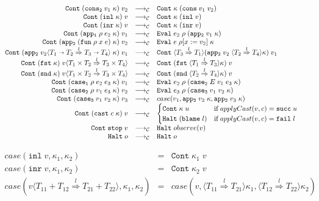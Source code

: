\documentclass[acmsmall,review,anonymous]{acmart}\settopmatter{printfolios=true,printccs=false,printacmref=false}
\newcommand{\funrule}[3]{#1 &=& #2 & #3\\}
\newcommand{\plus}[0]{+}
\newcommand{\sOOinspect}[3]{\mathtt{Eval} \; #1 \; #2 \; #3}
\newcommand{\sOOreturn}[2]{\mathtt{Cont} \; #2 \; #1}
\newcommand{\sOOhalt}[1]{\mathtt{Halt} \; #1}
\newcommand{\POOfun}[2]{#1 \shortrightarrow #2}
\newcommand{\POOprod}[2]{#1 \times #2}
\newcommand{\POOsum}[2]{#1 \plus #2}
\newcommand{\cOOcast}[3]{#1 \overset{#2}{\Rightarrow} #3}
\newcommand{\oOOblame}[1]{\mathtt{blame} \; #1}
\newcommand{\vOOcast}[2]{#1\langle#2\rangle}
\newcommand{\vOOfun}[3]{\mathtt{fun} \; #1 \; #2 \; #3}
\newcommand{\vOOcons}[2]{\mathtt{cons}\;#1\;#2}
\newcommand{\vOOinl}[1]{\mathtt{inl}\;#1}
\newcommand{\vOOinr}[1]{\mathtt{inr}\;#1}
\newcommand{\rOOsucc}[1]{\mathtt{succ}\;#1}
\newcommand{\rOOfail}[1]{\mathtt{fail}\;#1}
\newcommand{\kOOmt}[0]{\mathtt{stop}}
\newcommand{\kOOconsII}[2]{\mathtt{cons_2} \; #1 \; #2}
\newcommand{\kOOinl}[1]{\mathtt{inl} \; #1}
\newcommand{\kOOinr}[1]{\mathtt{inr} \; #1}
\newcommand{\kOOappI}[3]{
	\mathtt{app_1} \; #1 \; #2 \; #3
}
\newcommand{\kOOappII}[2]{
	\mathtt{app_2} \; #1 \; #2}
\newcommand{\kOOcaseI}[4]{
	\mathtt{case_1} \; #1 \; #2 \; #3 \; #4}
\newcommand{\kOOcaseII}[4]{
	\mathtt{case_2} \; #1 \; #2 \; #3 \; #4}
\newcommand{\kOOcaseIII}[3]{
	\mathtt{case_3} \; #1 \; #2 \; #3}
\newcommand{\sidecond}[1]{\text{if}\;#1}
\newcommand{\redrule}[3]{#1 & \longrightarrow_\mathcal{C} & #2 & #3\\}
\begin{document}
\begin{figure}
\[\begin{array}{rclr}
\redrule{
\sOOreturn{v_2}{(\kOOconsII{v_1}{\kappa})}}{
\sOOreturn{(\vOOcons{v_1}{v_2})}{\kappa}}{}

\redrule{
\sOOreturn{v}{(\kOOinl{\kappa})}}{
\sOOreturn{(\vOOinl{v})}{\kappa}}{}

\redrule{
\sOOreturn{v}{(\kOOinr{\kappa})}}{
\sOOreturn{(\vOOinr{v})}{\kappa}}{}

\redrule{
\sOOreturn{v_1}{(\kOOappI{\rho}{e_2}{\kappa})}}{
\sOOinspect{e_2}{\rho}{(\kOOappII{v_1}{\kappa})}}{}

\redrule{
\sOOreturn{v_2}{(\kOOappII{(\vOOfun{\rho}{x}{e})}{\kappa})}}{
\sOOinspect{e}{\rho[x:=v_2]}{\kappa}}{}
	\redrule{
		\sOOreturn{v_1}{(\mathtt{app_2} \; \vOOcast{v_2}{
				\cOOcast{\POOfun{T_1}{T_2}}{l}{\POOfun{T_3}{T_4}}
			} \; \kappa)}
	}{
		\sOOreturn{v_1}{
			\langle\cOOcast{T_3}{l}{T_1}\rangle
			(\mathtt{app_2} \; v_2 \; 
			\langle\cOOcast{T_2}{l}{T_4}\rangle \kappa)}
	}{}
	\redrule{
		\sOOreturn{
			\vOOcast{v}{\cOOcast{\POOprod{T_1}{T_2}}{l}{
					\POOprod{T_3}{T_4}}}
		}{(\mathtt{fst} \; \kappa)}
	}{
		\sOOreturn{v}{(
			\mathtt{fst} \;
			\langle \cOOcast{T_1}{l}{T_3} \rangle \kappa
			)}
	}{}
	
	\redrule{
		\sOOreturn{
			\vOOcast{v}{\cOOcast{\POOprod{T_1}{T_2}}{l}{
					\POOprod{T_3}{T_4}}}
		}{(\mathtt{snd} \; \kappa)}
	}{
		\sOOreturn{v}{(
			\mathtt{snd} \;
			\langle \cOOcast{T_2}{l}{T_4} \rangle \kappa
			)}
	}{}

\redrule{
\sOOreturn{v_1}{(\kOOcaseI{\rho}{e_2}{e_3}{\kappa})}}{
\sOOinspect{e_2}{\rho}{(\kOOcaseII{E}{v_1}{e_3}{\kappa})}}{}

\redrule{
\sOOreturn{v_2}{(\kOOcaseII{\rho}{v_1}{e_3}{\kappa})}}{
\sOOinspect{e_3}{\rho}{
	(\kOOcaseIII{v_1}{v_2}{\kappa})
}}{}	
		\redrule{
		\sOOreturn{v_3}{(
			\mathtt{case_3} \;
			v_1 \; v_2 \;
			\kappa
			)}
	}{case(v_1,
		\mathtt{app_2} \; v_2 \; \kappa,
		\mathtt{app_2} \; v_3 \; \kappa
		)}{}
	
	\redrule{
		\sOOreturn{v}{(
			\mathtt{cast} \; c \; \kappa
			)}
	}{
\begin{cases}
	\sOOreturn{u}{\kappa} & \sidecond{applyCast(v,c) = \rOOsucc{u}}
	\\
	\sOOhalt{(\oOOblame{l})} & \sidecond{applyCast(v,c) = \rOOfail{l}}
\end{cases}
	}{}
\redrule{
\sOOreturn{v}{\kOOmt}}{
\sOOhalt{observe(v)}}{}

\redrule{
\sOOhalt{o}}{
\sOOhalt{o}}{}
	\end{array}
	\]	
	
	\[
	\begin{array}{rclr}
	\funrule{case(\vOOinl{v},\kappa_1,\kappa_2)}{
		\sOOreturn{v}{\kappa_1}
	}{}
	\funrule{case(\vOOinr{v},\kappa_1,\kappa_2)}{
		\sOOreturn{v}{\kappa_2}
	}{}
	\funrule{case(\vOOcast{v}{\cOOcast{\POOsum{T_{11}}{T_{12}}}{l}{\POOsum{T_{21}}{T_{22}}}},\kappa_1,\kappa_2)}{
		case(v,
		\langle \cOOcast{T_{11}}{l}{T_{21}} \rangle \kappa_1,
		\langle \cOOcast{T_{12}}{l}{T_{22}} \rangle \kappa_2)
	}{}
	\end{array}
	\]
		

\end{figure}
\end{document}
